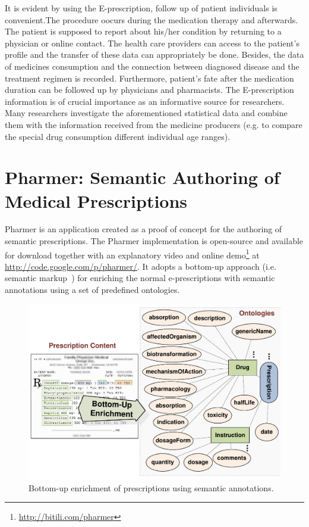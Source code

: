 \documentclass[10pt, conference, compsocconf]{IEEEtran}
\begin{document}
It is evident by using the E-prescription, follow up of patient individuals is convenient.The procedure oocurs during the medication therapy and afterwards. The patient is supposed to report about his/her condition by returning to a physician or online contact.
The health care providers can access to the patient's profile and the transfer of these data can appropriately be done.
Besides, the data of medicines consumption and the connection between diagnosed disease and the treatment regimen is recorded.
Furthermore, patient's fate after the medication duration can be followed up by physicians and pharmacists.
The E-prescription information is  of crucial importance as an  informative source for researchers.
Many researchers investigate the aforementioned statistical data and combine them with the information received from the medicine producers (e.g. to compare the special drug consumption different  individual age ranges).

\section{Pharmer: Semantic Authoring of Medical Prescriptions}
\label{pharmer}
Pharmer is an application created as a proof of concept for the authoring of semantic prescriptions.
The Pharmer implementation is open-source and available for download together with an explanatory video and online demo\footnote{\url{http://bitili.com/pharmer}} at \url{http://code.google.com/p/pharmer/}.
It adopts a bottom-up approach (i.e. semantic markup~\cite{araujo2010}) for enriching the normal e-prescriptions with semantic annotations using a set of predefined ontologies.

\begin{figure}[tb]
	\centering
		\includegraphics[width=1.0\columnwidth]{images/approaches.pdf}
	\caption{Bottom-up enrichment of prescriptions using semantic annotations.}
	\label{fig:botup}
\end{figure}
\end{document}
